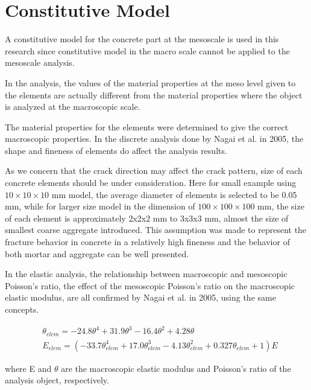 \section{Constitutive Model}

A constitutive model for the concrete part at the mesoscale is used in this research since constitutive model in the macro scale cannot be applied to the mesoscale analysis.

In the analysis, the values of the material properties at the meso level given to the elements are actually different from the material properties where the object is analyzed at the macroscopic scale.

The material properties for the elements were determined to give the correct macroscopic properties.  In the discrete analysis done by Nagai et al. in 2005\cite{Nagai}, the shape and fineness of elements do affect the analysis results.

As we concern that the crack direction may affect the crack pattern, size of each concrete elements should be under consideration. Here for small example using $10 \times 10 \times 10$ mm model, the average diameter of elements is selected to be 0.05 mm, while for larger size model in the dimension of $100 \times 100 \times 100$ mm, the size of each element is approximately 2x2x2 mm to 3x3x3 mm, almost the size of smallest coarse aggregate introduced. This assumption was made to represent the fracture behavior in concrete in a relatively high fineness and the behavior of both mortar and aggregate can be well presented.

In the elastic analysis, the relationship between macroscopic and mesoscopic Poisson's ratio, the effect of the mesoscopic Poisson's ratio on the macroscopic elastic modulus, are all confirmed by Nagai et al. in 2005\cite{Nagai}, using the same concepts.

\begin{equation}
  \begin{aligned}
  &\theta_{elem} = -24.8\theta^4+31.9\theta^3-16.4\theta^2 +4.28\theta\\
  &E_{elem} = (-33.7\theta_{elem}^4 + 17.0\theta_{elem}^3 - 4.13\theta_{elem}^2 + 0.327\theta_{elem} + 1)E
  \end{aligned}
\end{equation}

where E and $\theta$ are the macroscopic elastic modulus and Poisson's ratio of the analysis object, respectively.

